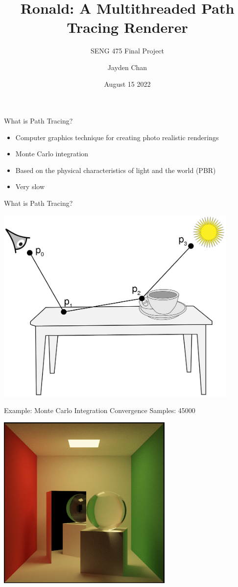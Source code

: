 \documentclass{beamer}
\title{Ronald: A Multithreaded Path Tracing Renderer}
\subtitle{SENG 475 Final Project}
\author{Jayden Chan}
\institute{\href{https://github.com/jayden-chan/ronald}{https://github.com/jayden-chan/ronald}}
\date{August 15 2022}
\begin{document}
\begin{frame}
\titlepage
\end{frame}

\begin{frame}{What is Path Tracing?}
    \begin{itemize}[<+->]
        \item Computer graphics technique for creating photo realistic renderings
        \item Monte Carlo integration
        \item Based on the physical characteristics of light and the world (PBR)
        \item Very slow
    \end{itemize}
\end{frame}

\begin{frame}{What is Path Tracing?}
    \begin{center}
        \includegraphics[width=0.9\textwidth]{./path_tracing.png}
    \end{center}
\end{frame}

\begin{frame}{Example: Monte Carlo Integration Convergence}
    Samples: 45000
    \begin{center}
        \includegraphics[width=0.65\textwidth]{../img/convergence/cornell-45000.png}
    \end{center}
\end{frame}
\end{document}
